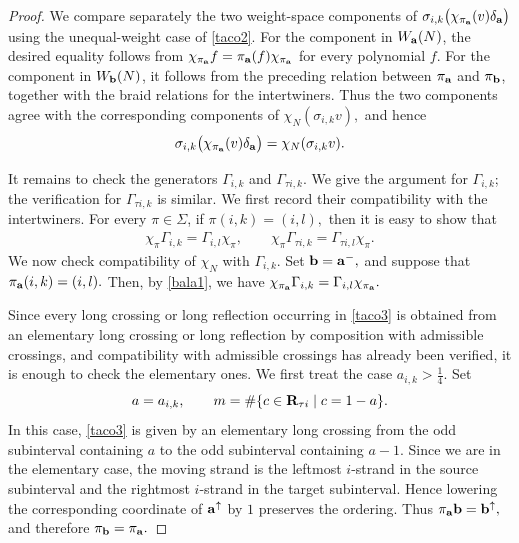 \begin{proof}
We compare separately the two weight-space components of
\(
\sigma_{i,k}
\bigl(
\chi_{\pi_{\mathbf{a}}}(v)\delta_{\mathbf{a}}
\bigr)
\)
using the unequal-weight case of \cref{taco2}. For the component in
\(W_{\mathbf{a}}(N)\), the desired equality follows from
\(
\chi_{\pi_{\mathbf{a}}}f
=
\pi_{\mathbf{a}}(f)\chi_{\pi_{\mathbf{a}}}
\)
for every polynomial \(f\). For the component in \(W_{\mathbf{b}}(N)\), it
follows from the preceding relation between \(\pi_{\mathbf{a}}\) and
\(\pi_{\mathbf{b}}\), together with the braid relations for the intertwiners.
Thus the two components agree with the corresponding components of
\(
\chi_N(\sigma_{i,k}v),
\)
and hence
\[
\sigma_{i,k}
\bigl(
\chi_{\pi_{\mathbf{a}}}(v)\delta_{\mathbf{a}}
\bigr)
=
\chi_N(\sigma_{i,k}v).
\]

It remains to check the generators
\(\Gamma_{i,k}\) and \(\Gamma_{\tau i,k}\). We give the argument for
\(\Gamma_{i,k}\); the verification for \(\Gamma_{\tau i,k}\) is similar. We first record their
compatibility with the intertwiners. For every \(\pi\in\Sigma\), if
\(
\pi(i,k)=(i,l),
\)
then it is easy to show that
\begin{gather}
\label{bala1}
\chi_\pi\Gamma_{i,k}
=
\Gamma_{i,l}\chi_\pi,
\qquad
\chi_\pi\Gamma_{\tau i,k}
=
\Gamma_{\tau i,l}\chi_\pi.
\end{gather}
We now check compatibility of $\chi_N$ with \(\Gamma_{i,k}\). Set
\(
\mathbf{b}=\mathbf{a}^-,
\)
and suppose that
\(
\pi_{\mathbf{a}}(i,k)=(i,l).
\)
Then, by \cref{bala1}, we have
\(
\chi_{\pi_{\mathbf{a}}}\Gamma_{i,k}
=
\Gamma_{i,l}\chi_{\pi_{\mathbf{a}}}.
\)

Since every long crossing or long reflection occurring in
\cref{taco3} is obtained from an elementary long crossing or long
reflection by composition with admissible crossings, and compatibility
with admissible crossings has already been verified, it is enough to
check the elementary ones. We first treat the case
\(
a_{i,k}>\frac14.
\)
Set
\[
a=a_{i,k},
\qquad
m=
\#\{c\in\mathbf{R}_{\tau i}\mid c=1-a\}.
\]
In this case, \cref{taco3} is given by an elementary long crossing
from the odd subinterval containing \(a\) to the odd subinterval
containing \(a-1\). Since we are in the elementary case, the moving
strand is the leftmost \(i\)-strand in the source subinterval and the
rightmost \(i\)-strand in the target subinterval. Hence lowering the
corresponding coordinate of \(\mathbf{a}^\uparrow\) by \(1\) preserves the
ordering. Thus
\(
\pi_{\mathbf{a}}\mathbf{b}=\mathbf{b}^\uparrow,
\)
and therefore
\(
\pi_{\mathbf{b}}=\pi_{\mathbf{a}}.
\)


\end{proof}
